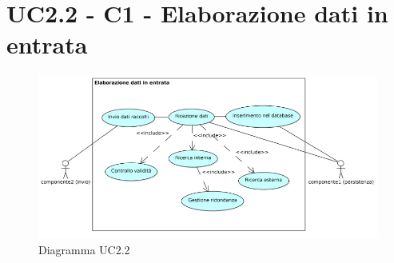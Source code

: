 \section{UC2.2 - C1 - Elaborazione dati in entrata}
\begin{figure}[h]
  \centering
  \includegraphics[width=18cm]{img/AR/UC2_2.png}
\caption{Diagramma UC2.2}
\end{figure}

